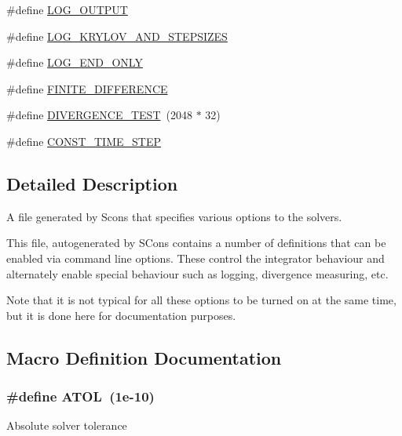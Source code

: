 \begin{DoxyCompactItemize}
\item 
\#define \hyperlink{solver__options_8cuh_ac786f5f1963363a48eed565f7cbc6931}{L\+O\+G\+\_\+\+O\+U\+T\+P\+UT}
\item 
\#define \hyperlink{solver__options_8cuh_a2adffa059bbd6f183ff7f63db602ac42}{L\+O\+G\+\_\+\+K\+R\+Y\+L\+O\+V\+\_\+\+A\+N\+D\+\_\+\+S\+T\+E\+P\+S\+I\+Z\+ES}
\item 
\#define \hyperlink{solver__options_8cuh_a09cc461392fae3949d88392adf655db5}{L\+O\+G\+\_\+\+E\+N\+D\+\_\+\+O\+N\+LY}
\item 
\#define \hyperlink{solver__options_8cuh_a9e28db46fb24c2d46dbfe205c6a11236}{F\+I\+N\+I\+T\+E\+\_\+\+D\+I\+F\+F\+E\+R\+E\+N\+CE}
\item 
\#define \hyperlink{solver__options_8cuh_afd8c973bc66908100d15f47ae514ed41}{D\+I\+V\+E\+R\+G\+E\+N\+C\+E\+\_\+\+T\+E\+ST}~(2048 $\ast$ 32)
\item 
\#define \hyperlink{solver__options_8cuh_a66c8290aad471b0be7768f635f03c349}{C\+O\+N\+S\+T\+\_\+\+T\+I\+M\+E\+\_\+\+S\+T\+EP}
\end{DoxyCompactItemize}


\subsection{Detailed Description}
A file generated by Scons that specifies various options to the solvers. 

This file, autogenerated by S\+Cons contains a number of definitions that can be enabled via command line options. These control the integrator behaviour and alternately enable special behaviour such as logging, divergence measuring, etc.

Note that it is not typical for all these options to be turned on at the same time, but it is done here for documentation purposes. 

\subsection{Macro Definition Documentation}
\subsubsection[{\texorpdfstring{A\+T\+OL}{ATOL}}]{\setlength{\rightskip}{0pt plus 5cm}\#define A\+T\+OL~(1e-\/10)}\hypertarget{solver__options_8cuh_a29a15cd00b37b1f4a5b4ec9f07c742f4}{}\label{solver__options_8cuh_a29a15cd00b37b1f4a5b4ec9f07c742f4}
Absolute solver tolerance 
